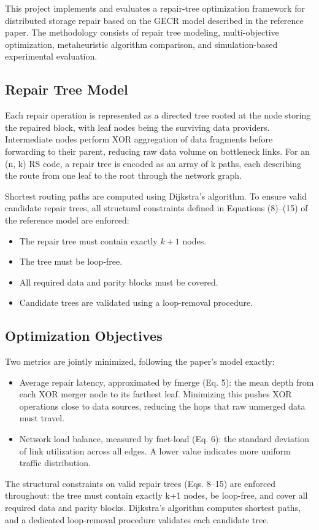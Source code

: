 \documentclass[sigconf]{acmart}
\begin{document}
This project implements and evaluates a repair-tree optimization framework
for distributed storage repair based on the GECR model described in the
reference paper. The methodology consists of repair tree modeling,
multi-objective optimization, metaheuristic algorithm comparison, and
simulation-based experimental evaluation.

\subsection{Repair Tree Model}

Each repair operation is represented as a directed tree rooted at the node storing the repaired block, with leaf nodes being the surviving data providers. Intermediate nodes perform XOR aggregation of data fragments before forwarding to their parent, reducing raw data volume on bottleneck links. For an (n, k) RS code, a repair tree is encoded as an array of k paths, each describing the route from one leaf to the root through the network graph.

Shortest routing paths are computed using Dijkstra's algorithm. To
ensure valid candidate repair trees, all structural constraints defined
in Equations (8)--(15) of the reference model are enforced:

\begin{itemize}
    \item The repair tree must contain exactly $k+1$ nodes.
    \item The tree must be loop-free.
    \item All required data and parity blocks must be covered.
    \item Candidate trees are validated using a loop-removal procedure.
\end{itemize}

\subsection{Optimization Objectives}

Two metrics are jointly minimized, following the paper's model exactly:
\begin{itemize}
    \item Average repair latency, approximated by fmerge (Eq. 5): the mean depth from each XOR merger node to its farthest leaf. Minimizing this pushes XOR operations close to data sources, reducing the hops that raw unmerged data must travel.
    \item Network load balance, measured by fnet-load (Eq. 6): the standard deviation of link utilization across all edges. A lower value indicates more uniform traffic distribution.
\end{itemize}
The structural constraints on valid repair trees (Eqs. 8–15) are enforced throughout: the tree must contain exactly k+1 nodes, be loop-free, and cover all required data and parity blocks. Dijkstra's algorithm computes shortest paths, and a dedicated loop-removal procedure validates each candidate tree.
\end{document}
